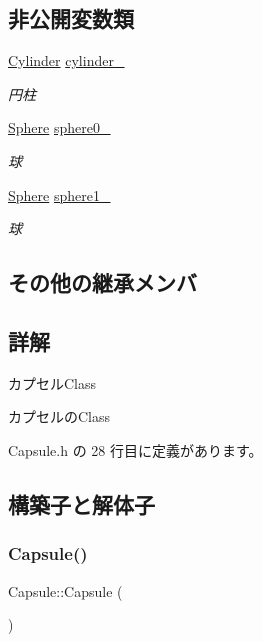 \subsection*{非公開変数類}
\begin{DoxyCompactItemize}
\item 
\mbox{\hyperlink{class_cylinder}{Cylinder}} \mbox{\hyperlink{class_capsule_a7b7f46d36a0d810555aa5eb62da6a8ed}{cylinder\+\_\+}}
\begin{DoxyCompactList}\small\item\em 円柱 \end{DoxyCompactList}\item 
\mbox{\hyperlink{class_sphere}{Sphere}} \mbox{\hyperlink{class_capsule_a37c7db7fe8cb06be2f374d7aba24267e}{sphere0\+\_\+}}
\begin{DoxyCompactList}\small\item\em 球 \end{DoxyCompactList}\item 
\mbox{\hyperlink{class_sphere}{Sphere}} \mbox{\hyperlink{class_capsule_ac478efc95993a85908a7cd2759133ab2}{sphere1\+\_\+}}
\begin{DoxyCompactList}\small\item\em 球 \end{DoxyCompactList}\end{DoxyCompactItemize}
\subsection*{その他の継承メンバ}


\subsection{詳解}
カプセル\+Class 

カプセルの\+Class 

 Capsule.\+h の 28 行目に定義があります。



\subsection{構築子と解体子}
\mbox{\label{class_capsule_a4324279c9cc08241083b53c3a3dec44c}} 
\subsubsection{\texorpdfstring{Capsule()}{Capsule()}}
{\footnotesize\ttfamily Capsule\+::\+Capsule (\begin{DoxyParamCaption}{ }\end{DoxyParamCaption})\hspace{0.3cm}{\ttfamily [inline]}}



